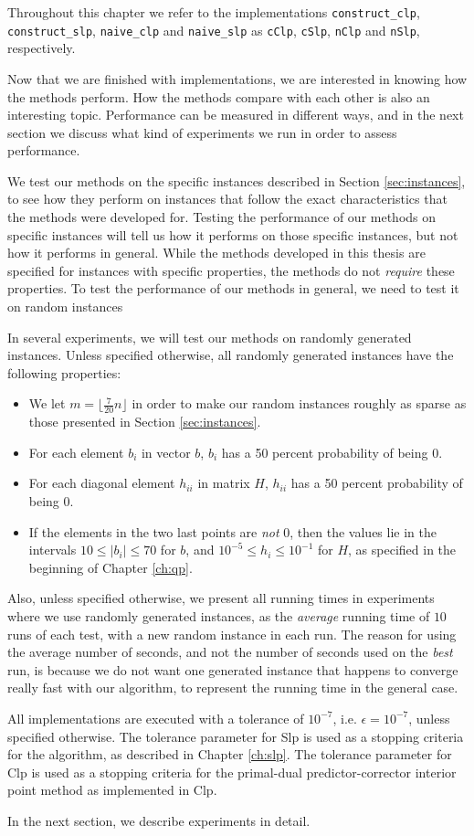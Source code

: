 Throughout this chapter we refer to the implementations \texttt{construct\_clp},
\texttt{construct\_slp}, \texttt{naive\_clp} and \texttt{naive\_slp} as
\texttt{cClp}, \texttt{cSlp}, \texttt{nClp} and \texttt{nSlp}, respectively.

Now that we are finished with implementations, we are interested in knowing
how the methods perform.
How the methods compare with each other is also an interesting topic.
Performance can be measured in different ways, and in the next section we
discuss what kind of experiments we run in order to assess performance.

We test our methods on the specific instances described in
Section \ref{sec:instances}, to see how they perform on instances that follow
the exact characteristics that the methods were developed for.
Testing the performance of our methods on specific instances will tell us
how it performs on those specific instances, but not how it performs in general.
While the methods developed in this thesis are specified for instances with
specific properties, the methods do not \emph{require} these properties.
To test the performance of our methods in general, we need to test it
on random instances

In several experiments, we will test our methods on randomly generated
instances.
Unless specified otherwise, all randomly generated instances have
the following properties:
\begin{itemize}
\item We let $m = \lfloor \frac{7}{20}n \rfloor$ in order to make our random
      instances roughly as sparse as those presented in Section
      \ref{sec:instances}.
\item For each element $b_i$ in vector $b$, $b_i$ has a 50 percent probability of being 0.
\item For each diagonal element $h_{ii}$ in matrix $H$, $h_{ii}$ has a 50 percent
      probability of being 0.
\item If the elements in the two last points are \emph{not} 0, then the values lie in
      the intervals $10 \leq |b_i| \leq 70$ for $b$, and
      $10^{-5} \leq h_i \leq 10^{-1}$ for $H$, as specified in the beginning of
      Chapter \ref{ch:qp}.
\end{itemize}

Also, unless specified otherwise, we present all running times in experiments where
we use randomly generated instances, as the \emph{average} running time of
$10$ runs of each test, with a new random instance in each run.
The reason for using the average number of seconds, and
not the number of seconds used on the \emph{best} run, is because we do not want
one generated instance that happens to converge really fast with our algorithm,
to represent the running time in the general case.

All implementations are executed with a tolerance of $10^{-7}$, i.e.
$\epsilon = 10^{-7}$, unless specified otherwise.
The tolerance parameter for Slp is used as a stopping criteria for
the algorithm, as described in Chapter \ref{ch:slp}.
The tolerance parameter for Clp is used as a stopping criteria
for the primal-dual predictor-corrector interior point method as implemented
in Clp.

In the next section, we describe experiments in detail.
